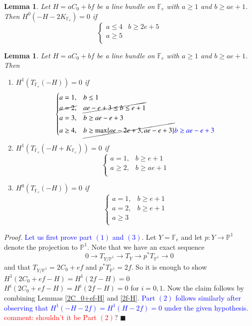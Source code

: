 \documentclass[11pt,twoside]{amsart}
\theoremstyle{plain}
\numberwithin{equation}{section}
\newtheorem{lemma}[theorem]{Lemma}
\theoremstyle{definition}
\newcommand*{\QEDA}{\hfill\ensuremath{\blacksquare}}
\begin{document}
\begin{lemma}\label{-H-2K_Y}
Let $H = aC_0+bf$ be a line bundle on $\mathbb{F}_e$ with $a \geq 1$ and $b \geq ae+1$. Then $H^0(-H-2K_{\mathbb{F}_e}) = 0$ if 
\[
\begin{cases}
   a \leq 4 & b \geq 2e+5  \\
   a \geq 5 &   \\
   
\end{cases}
\]
    
\end{lemma}

\begin{lemma}\label{T_Y(-H)}
Let $H = aC_0+bf$ be a line bundle on $\mathbb{F}_e$ with $a \geq 1$ and $b \geq ae+1$. Then 
\begin{enumerate}
    \item[(1)] $H^1(T_{\mathbb{F}_e}(-H)) = 0$ if 
\[
\begin{cases}
   a = 1, & b \leq 1  \\
   \cancel{a = 2,} & \cancel{ae-e+3 \leq b \leq e+1}  \\
   a = 3, & b \geq ae-e+3 \\
   a \geq 4, & \cancel{b \geq \operatorname{max}\{ae-2e+3, ae-e+3\}} \textcolor{blue}{b \geq ae-e+3}
   
\end{cases}
\]

  \item[(2)] $H^1(T_{\mathbb{F}_e}(-H+K_{\mathbb{F}_e})) = 0$ if 
\[
\begin{cases}
   a = 1, & b \geq e+1  \\
   a \geq 2, & b \geq ae+1 \\
\end{cases}
\] 

\item[(3)] $H^0(T_{\mathbb{F}_e}(-H)) = 0$ if 
\[
\begin{cases}
   a = 1, & b \geq e+1  \\
   a = 2, & b \geq e+1 \\
   a \geq 3 & \\
\end{cases}
\] 

\end{enumerate}

\end{lemma}

\noindent\textit{Proof.} \textcolor{blue}{Let us first prove part $(1)$ and $(3)$}. Let $Y = \mathbb{F}_e$ and let $p: Y \to \mathbb{P}^1$ denote the projection to $\mathbb{P}^1$. Note that we have an exact sequence 
$$0 \to T_{Y/\mathbb{P}^1} \to T_Y \to p^*T_{\mathbb{P}^1} \to 0$$
and that $T_{Y/\mathbb{P}^1} = 2C_0+ef$ and $p^*T_{\mathbb{P}^1} = 2f$. So it is enough to show \sout{$H^1(2C_0+ef-H) = H^1(2f-H) = 0$} $H^i(2C_0+ef-H) = H^i(2f-H) = 0$ for $i = 0,1$. Now the claim follows by combining Lemmas \ref{2C_0+ef-H} and \ref{2f-H}.
\textcolor{blue}{Part $(2)$ follows similarly after observing that $H^1(-H-2f) = H^1(H-2f) = 0$ under the given hypothesis. }
\textcolor{red}{comment: shouldn't it be Part $(2)$}?
\QEDA
\end{document}
